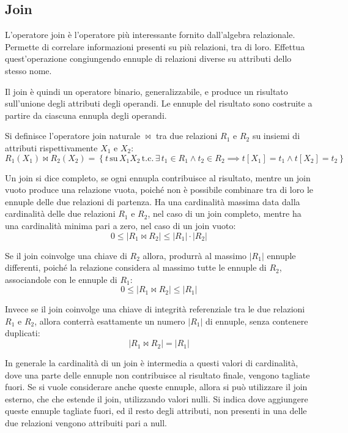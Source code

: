 \documentclass{article}
\numberwithin{equation}{subsection}
\begin{document}
\subsection{Join}

L'operatore join è l'operatore più interessante fornito dall'algebra relazionale. Permette di correlare informazioni presenti su più relazioni, tra di loro. Effettua quest'operazione congiungendo 
ennuple di relazioni diverse su attributi dello stesso nome. 

Il join è quindi un operatore binario, generalizzabile, e produce un risultato sull'unione degli attributi degli operandi. Le ennuple del risultato sono costruite a partire da ciascuna ennupla degli operandi. 

Si definisce l'operatore join naturale $\Join$ tra due relazioni $R_1$ e $R_2$ su insiemi di attributi rispettivamente $X_1$ e $X_2$:
\begin{equation}
    R_1(X_1)\Join R_2(X_2)=\left\{t\,\mbox{su}\,X_1X_2\,\mbox{t.c.}\,\exists \,t_1\in R_1\land t_2\in R_2\implies t[X_1]=t_1\land t[X_2]=t_2\right\}
\end{equation} 

Un join si dice completo, se ogni ennupla contribuisce al risultato, mentre un join vuoto produce una relazione vuota, poiché non è possibile combinare tra di loro le ennuple delle due relazioni di partenza. 
Ha una cardinalità massima data dalla cardinalità delle due relazioni $R_1$ e $R_2$, nel caso di un join completo, mentre ha una cardinalità minima pari a zero, nel caso di un join vuoto:
\begin{equation}
    0\leq |R_1\Join R_2|\leq |R_1|\cdot|R_2|
\end{equation} 

Se il join coinvolge una chiave di $R_2$ allora, produrrà al massimo $|R_1|$ ennuple differenti, poiché la relazione considera al massimo tutte le ennuple di $R_2$, associandole con le ennuple di $R_1$:
\begin{equation*}
    0\leq |R_1\Join R_2|\leq |R_1|
\end{equation*}

Invece se il join coinvolge una chiave di integrità referenziale tra le due relazioni $R_1$ e $R_2$, allora conterrà esattamente un numero $|R_1|$ di ennuple, senza contenere duplicati:
\begin{equation*}
    |R_1\Join R_2|=|R_1|
\end{equation*}

In generale la cardinalità di un join è intermedia a questi valori di cardinalità, dove una parte delle ennuple non contribuisce al risultato finale, vengono tagliate fuori. 
Se si vuole considerare anche queste ennuple, allora si può utilizzare il join esterno, che che estende il join, utilizzando valori nulli. Si indica dove aggiungere queste ennuple tagliate fuori, ed il resto degli 
attributi, non presenti in una delle due relazioni vengono attribuiti pari a null. 
\end{document}
